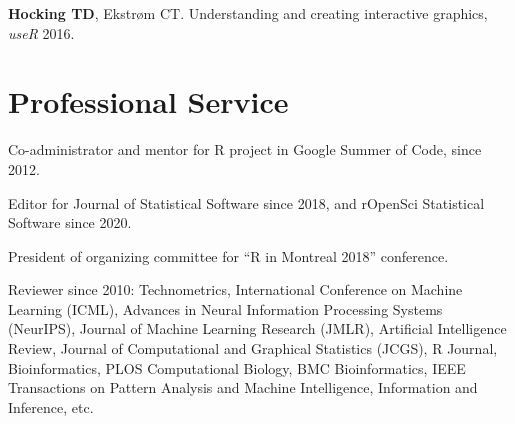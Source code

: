 \documentclass[margin,line]{res}
\begin{document}
\begin{resume}
{\bf Hocking TD}, Ekstr\o m CT. Understanding and creating interactive
graphics, {\it useR} 2016.

\section{\sc Professional Service}

Co-administrator and mentor for R project in Google Summer of Code,
since 2012.

Editor for Journal of Statistical Software since 2018, and rOpenSci
Statistical Software since 2020.

President of organizing committee for ``R in Montreal 2018'' conference.

Reviewer since 2010: Technometrics, International Conference on
Machine Learning (ICML), Advances in Neural Information Processing
Systems (NeurIPS), Journal of Machine Learning Research (JMLR),
Artificial Intelligence Review, Journal of Computational and Graphical
Statistics (JCGS), R Journal, Bioinformatics, PLOS Computational
Biology, BMC Bioinformatics, IEEE Transactions on Pattern Analysis and
Machine Intelligence, Information and Inference, etc.

\end{resume}
\end{document}
